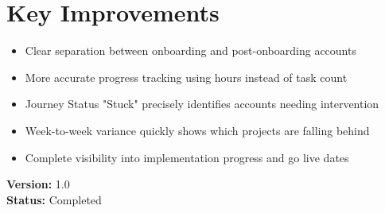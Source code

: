 \documentclass[12pt,a4paper]{article}
\begin{document}
\section*{Key Improvements}

\begin{itemize}[leftmargin=*]
    \item Clear separation between onboarding and post-onboarding accounts
    \item More accurate progress tracking using hours instead of task count
    \item Journey Status "Stuck" precisely identifies accounts needing intervention
    \item Week-to-week variance quickly shows which projects are falling behind
    \item Complete visibility into implementation progress and go live dates
\end{itemize}

\vspace{1cm}

\noindent\textbf{Version:} 1.0 \\
\textbf{Status:} Completed
\end{document}
